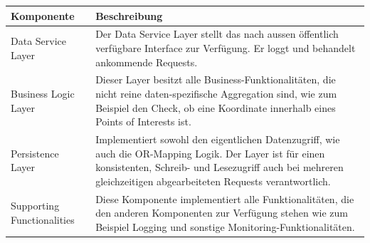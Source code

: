 \documentclass[ngerman,]{article}
\begin{document}
\begin{longtable}[]{@{}ll@{}}
\toprule
\begin{minipage}[b]{0.11\columnwidth}\raggedright\strut
\textbf{Komponente}\strut
\end{minipage} & \begin{minipage}[b]{0.83\columnwidth}\raggedright\strut
\textbf{Beschreibung}\strut
\end{minipage}\tabularnewline
\midrule
\endhead
\begin{minipage}[t]{0.11\columnwidth}\raggedright\strut
Data Service Layer\strut
\end{minipage} & \begin{minipage}[t]{0.83\columnwidth}\raggedright\strut
Der Data Service Layer stellt das nach aussen öffentlich verfügbare
Interface zur Verfügung. Er loggt und behandelt ankommende
Requests.\strut
\end{minipage}\tabularnewline
\begin{minipage}[t]{0.11\columnwidth}\raggedright\strut
Business Logic Layer\strut
\end{minipage} & \begin{minipage}[t]{0.83\columnwidth}\raggedright\strut
Dieser Layer besitzt alle Business-Funktionalitäten, die nicht reine
daten-spezifische Aggregation sind, wie zum Beispiel den Check, ob eine
Koordinate innerhalb eines Points of Interests ist.\strut
\end{minipage}\tabularnewline
\begin{minipage}[t]{0.11\columnwidth}\raggedright\strut
Persistence Layer\strut
\end{minipage} & \begin{minipage}[t]{0.83\columnwidth}\raggedright\strut
Implementiert sowohl den eigentlichen Datenzugriff, wie auch die
OR-Mapping Logik. Der Layer ist für einen konsistenten, Schreib- und
Lesezugriff auch bei mehreren gleichzeitigen abgearbeiteten Requests
verantwortlich.\strut
\end{minipage}\tabularnewline
\begin{minipage}[t]{0.11\columnwidth}\raggedright\strut
Supporting Functionalities\strut
\end{minipage} & \begin{minipage}[t]{0.83\columnwidth}\raggedright\strut
Diese Komponente implementiert alle Funktionalitäten, die den anderen
Komponenten zur Verfügung stehen wie zum Beispiel Logging und sonstige
Monitoring-Funktionalitäten.\strut
\end{minipage}\tabularnewline
\bottomrule
\end{longtable}
\end{document}
